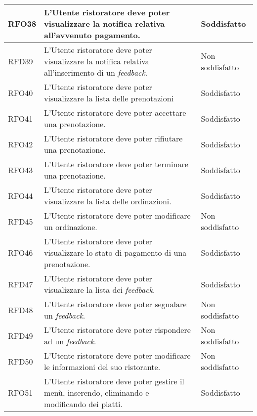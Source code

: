 \begin{longtable}{|l|p{}|p{3cm}|}
	\hline
	RFO38       & L'Utente ristoratore deve poter visualizzare la notifica relativa all'avvenuto pagamento.                            	& Soddisfatto       \\
	\hline
	RFD39       & L'Utente ristoratore deve poter visualizzare la notifica relativa all'inserimento di un \textit{feedback}.           	& Non soddisfatto	\\
	\hline
	RFO40       & L'Utente ristoratore deve poter visualizzare la lista delle prenotazioni											   	& Soddisfatto		\\
	\hline		
	RFO41       & L'Utente ristoratore deve poter accettare una prenotazione.															& Soddisfatto       \\
	\hline
	RFO42       & L'Utente ristoratore deve poter rifiutare una prenotazione.                                                           & Soddisfatto       \\
	\hline
	RFO43       & L'Utente ristoratore deve poter terminare una prenotazione.                                                           & Soddisfatto       \\
	\hline
	RFO44       & L'Utente ristoratore deve poter visualizzare la lista delle ordinazioni.                                              & Soddisfatto       \\
	\hline
	RFD45       & L'Utente ristoratore deve poter modificare un ordinazione.                                                            & Non soddisfatto   \\
	\hline
	RFO46       & L'Utente ristoratore deve poter visualizzare lo stato di pagamento di una prenotazione.                               & Soddisfatto       \\
	\hline
	RFD47       & L'Utente ristoratore deve poter visualizzare la lista dei \textit{feedback}.                                          & Soddisfatto       \\
	\hline
	RFD48       & L'Utente ristoratore deve poter segnalare un \textit{feedback}.                                                       & Non soddisfatto	\\
	\hline
	RFD49       & L'Utente ristoratore deve poter rispondere ad un \textit{feedback}.                                                   & Non soddisfatto	\\
	\hline
	RFD50       & L'Utente ristoratore deve poter modificare le informazioni del suo ristorante.										& Non soddisfatto	\\
	\hline
	RFO51       & L'Utente ristoratore deve poter gestire il menù, inserendo, eliminando e modificando dei piatti.                      & Soddisfatto \\

\end{longtable}
